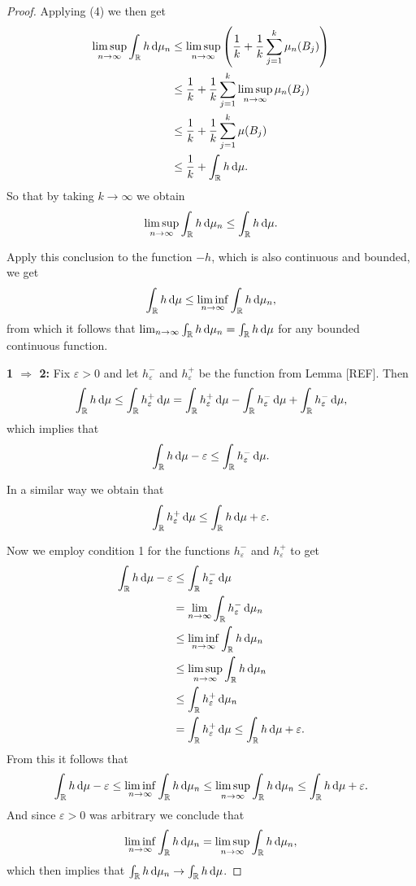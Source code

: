 \begin{proof}
Applying (4) we then get
\begin{align*}
	\limsup_{n \to \infty} \int_{\mathbb R} h \, \mathrm{d} \mu_n
	&\le  \limsup_{n \to \infty} \left(\frac{1}{k} + \frac{1}{k} \sum_{j = 1}^k \mu_n(B_j) \right)\\
	&\le \frac{1}{k} + \frac{1}{k} \sum_{j = 1}^k \limsup_{n \to \infty} \mu_n(B_j)\\
	&\le \frac{1}{k} + \frac{1}{k} \sum_{j = 1}^k \mu(B_j) \\
	&\le \frac{1}{k} + \int_{\mathbb R} h \, \mathrm{d} \mu.
\end{align*}
So that by taking $k \to \infty$ we obtain
\[
	\limsup_{n \to \infty} \int_{\mathbb R} h \, \mathrm{d} \mu_n \le \int_{\mathbb R} h \, \mathrm{d} \mu.
\]

Apply this conclusion to the function $-h$, which is also continuous and bounded, we get
\[
	\int_{\mathbb R} h \, \mathrm{d} \mu \le \liminf_{n \to \infty} \int_{\mathbb R} h \, \mathrm{d} \mu_n,
\]
from which it follows that $\lim_{n \to \infty} \int_{\mathbb R} h \, \mathrm{d} \mu_n = \int_{\mathbb R} h \, \mathrm{d} \mu$ for any bounded continuous function.

\textbf{1 $\Rightarrow$ 2:} Fix $\varepsilon > 0$ and let $h^-_\varepsilon$ and $h^+_\varepsilon$ be the function from Lemma [REF]. Then
\[
	\int_{\mathbb R} h \, \mathrm{d} \mu \le \int_{\mathbb R} h^+_\varepsilon \, \mathrm{d} \mu 
	= \int_{\mathbb R} h^+_\varepsilon \, \mathrm{d} \mu - \int_{\mathbb R} h^-_\varepsilon \, \mathrm{d} \mu
	+ \int_{\mathbb R} h^-_\varepsilon \, \mathrm{d} \mu,
\]
which implies that
\[
	 \int_{\mathbb R} h \, \mathrm{d} \mu -\varepsilon \le \int_{\mathbb R} h^-_\varepsilon \, \mathrm{d} \mu.
\]

In a similar way we obtain that
\[
	\int_{\mathbb R} h^+_\varepsilon \, \mathrm{d} \mu \le \int_{\mathbb R} h \, \mathrm{d} \mu +\varepsilon.
\]

Now we employ condition 1 for the functions $h^-_\varepsilon$ and $h^+_\varepsilon$ to get
\begin{align*}
	\int_{\mathbb R} h \, \mathrm{d} \mu -\varepsilon &\le \int_{\mathbb R} h^-_\varepsilon \, \mathrm{d} \mu\\
	&= \lim_{n \to \infty} \int_{\mathbb R} h^-_\varepsilon \, \mathrm{d} \mu_n\\
	&\le \liminf_{n \to \infty} \int_{\mathbb R} h \, \mathrm{d} \mu_n \\
	&\le \limsup_{n \to \infty} \int_{\mathbb R} h \, \mathrm{d} \mu_n\\
	&\le \int_{\mathbb R} h^+_\varepsilon \, \mathrm{d} \mu_n\\
	&= \int_{\mathbb R} h^+_\varepsilon \, \mathrm{d} \mu \le \int_{\mathbb R} h \, \mathrm{d} \mu +\varepsilon.
\end{align*}
From this it follows that
\[
	\int_{\mathbb R} h \, \mathrm{d} \mu -\varepsilon \le \liminf_{n \to \infty} \int_{\mathbb R} h \, \mathrm{d} \mu_n
	\le \limsup_{n \to \infty} \int_{\mathbb R} h \, \mathrm{d} \mu_n \le \int_{\mathbb R} h \, \mathrm{d} \mu +\varepsilon.
\]
And since $\varepsilon > 0$ was arbitrary we conclude that
\[
	\liminf_{n \to \infty} \int_{\mathbb R} h \, \mathrm{d} \mu_n = \limsup_{n \to \infty} \int_{\mathbb R} h \, \mathrm{d} \mu_n,
\]
which then implies that $\int_{\mathbb R} h \, \mathrm{d} \mu_n \to \int_{\mathbb R} h \, \mathrm{d} \mu$.


\end{proof}
